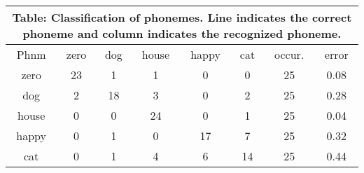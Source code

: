 \documentclass[10pt]{article}
\begin{document}
\tiny
\begin{tabular}{|@{}c@{}||@{}c@{}|@{}c@{}|@{}c@{}|@{}c@{}|@{}c@{}|@{}c@{}|@{}c@{}|}
\hline
\multicolumn{8}{c}{Table: Classification of phonemes. Line indicates the correct phoneme and column indicates the recognized phoneme.} \\ \hline \hline
Phnm & zero & dog & house & happy & cat & occur. & error \\ \hline
zero & 23 & 1 & 1 & 0 & 0 & 25 & 0.08 \\ \hline
dog & 2 & 18 & 3 & 0 & 2 & 25 & 0.28 \\ \hline
house & 0 & 0 & 24 & 0 & 1 & 25 & 0.04 \\ \hline
happy & 0 & 1 & 0 & 17 & 7 & 25 & 0.32 \\ \hline
cat & 0 & 1 & 4 & 6 & 14 & 25 & 0.44 \\ \hline
\end{tabular}
\end{document}
